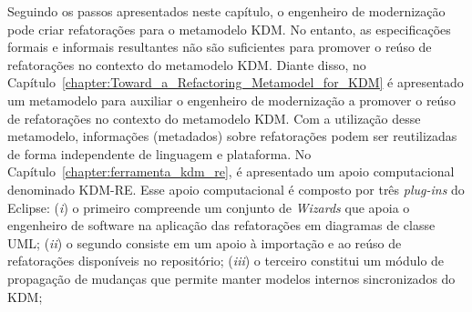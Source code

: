 Seguindo os passos apresentados neste capítulo, o engenheiro de modernização pode criar refatorações para o metamodelo KDM. No entanto, as especificações formais e informais resultantes não são suficientes para promover o reúso de refatorações no contexto do metamodelo KDM. Diante disso, no Capítulo~\ref{chapter:Toward_a_Refactoring_Metamodel_for_KDM} é apresentado um metamodelo para auxiliar o engenheiro de modernização a promover o reúso de refatorações no contexto do metamodelo KDM. Com a utilização desse metamodelo, informações (metadados) sobre refatorações podem ser reutilizadas de forma independente de linguagem e plataforma. %
No Capítulo~\ref{chapter:ferramenta_kdm_re}, é apresentado um apoio computacional denominado KDM-RE. Esse apoio computacional é composto por três \textit{plug-ins} do Eclipse: (\textit{i}) o primeiro compreende um conjunto de \textit{Wizards} que apoia o engenheiro de software na aplicação das refatorações em diagramas de classe UML; (\textit{ii}) o segundo consiste em um apoio à importação e ao reúso de refatorações disponíveis no repositório; (\textit{iii}) o terceiro constitui um módulo de propagação de mudanças que permite manter modelos internos sincronizados do KDM; 
